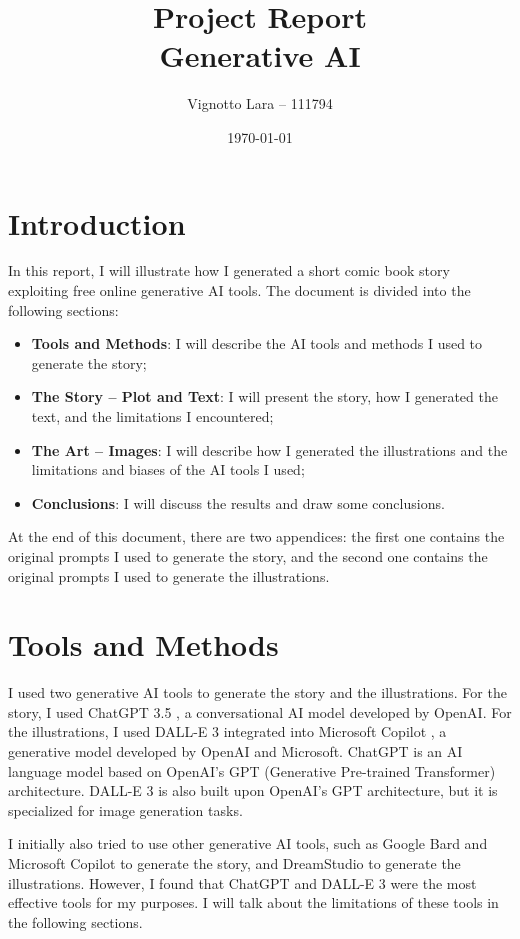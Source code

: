 \documentclass[a4paper,11pt]{article}
\title{\Huge \textbf{Project Report}\\Generative AI}
\author{Vignotto Lara -- 111794}
\date{\today}
\begin{document}
\maketitle
\vspace{6cm}
\tableofcontents
\newpage



\section{Introduction}
In this report, I will illustrate how I generated a short comic book story exploiting free online generative AI tools. The document is divided into the following sections:
\begin{itemize}
    \item \textbf{Tools and Methods}: I will describe the AI tools and methods I used to generate the story;
    \item \textbf{The Story -- Plot and Text}: I will present the story, how I generated the text, and the limitations I encountered;
    \item \textbf{The Art -- Images}: I will describe how I generated the illustrations and the limitations and biases of the AI tools I used;
    \item \textbf{Conclusions}: I will discuss the results and draw some conclusions.
\end{itemize}
At the end of this document, there are two appendices: the first one contains the original prompts I used to generate the story, and the second one contains the original prompts I used to generate the illustrations.



\section{Tools and Methods}
I used two generative AI tools to generate the story and the illustrations. For the story, I used ChatGPT 3.5 \cite{gpt}, a conversational AI model developed by OpenAI. For the illustrations, I used DALL-E 3 integrated into Microsoft Copilot \cite{copilot2023}, a generative model developed by OpenAI and Microsoft. 
ChatGPT is an AI language model based on OpenAI's GPT (Generative Pre-trained Transformer) architecture. DALL-E 3 is also built upon OpenAI's GPT architecture, but it is specialized for image generation tasks. 

I initially also tried to use other generative AI tools, such as Google Bard \cite{bard} and Microsoft Copilot to generate the story, and DreamStudio \cite{dreamstudio} to generate the illustrations. However, I found that ChatGPT and DALL-E 3 were the most effective tools for my purposes. I will talk about the limitations of these tools in the following sections.
\end{document}
